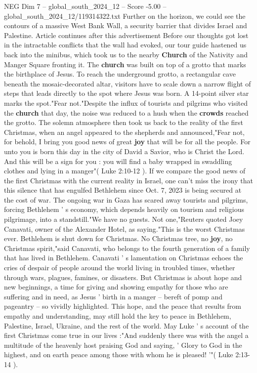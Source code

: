 \begin{textsample}{NEG Dim 7 – global\_south\_2024\_12 – Score -5.00 – global\_south\_2024\_12/119314322.txt}
Further on the horizon, we could see the contours of a massive West Bank Wall, a security barrier that divides Israel and Palestine.
Article continues after this advertisement Before our thoughts got lost in the intractable conflicts that the wall had evoked, our tour guide hastened us back into the minibus, which took us to the nearby \textbf{Church} of the Nativity and Manger Square fronting it.
The \textbf{church} was built on top of a grotto that marks the birthplace of Jesus.
To reach the underground grotto, a rectangular cave beneath the mosaic-decorated altar, visitors have to scale down a narrow flight of steps that leads directly to the spot where Jesus was born.
A 14-point silver star marks the spot."Fear not."Despite the influx of tourists and pilgrims who visited the \textbf{church} that day, the noise was reduced to a hush when the \textbf{crowds} reached the grotto.
The solemn atmosphere then took us back to the reality of the first Christmas, when an angel appeared to the shepherds and announced,"Fear not, for behold, I bring you good news of great \textbf{joy} that will be for all the people.
For unto you is born this day in the city of David a Savior, who is Christ the Lord.
And this will be a sign for you : you will find a baby wrapped in swaddling clothes and lying in a manger"( Luke 2:10-12 ).
If we compare the good news of the first Christmas with the current reality in Israel, one can't miss the irony that this silence that has engulfed Bethlehem since Oct. 7, 2023 is being secured at the cost of war.
The ongoing war in Gaza has scared away tourists and pilgrims, forcing Bethlehem ' s economy, which depends heavily on tourism and religious pilgrimage, into a standstill."We have no guests.
Not one,"Reuters quoted Joey Canavati, owner of the Alexander Hotel, as saying."This is the worst Christmas ever.
Bethlehem is shut down for Christmas.
No Christmas tree, no \textbf{joy}, no Christmas spirit,"said Canavati, who belongs to the fourth generation of a family that has lived in Bethlehem.
Canavati ' s lamentation on Christmas echoes the cries of despair of people around the world living in troubled times, whether through wars, plagues, famines, or disasters.
But Christmas is about hope and new beginnings, a time for giving and showing empathy for those who are suffering and in need, as Jesus ' birth in a manger -- bereft of pomp and pageantry -- so vividly highlighted.
This hope, and the peace that results from empathy and understanding, may still hold the key to peace in Bethlehem, Palestine, Israel, Ukraine, and the rest of the world.
May Luke ' s account of the first Christmas come true in our lives :"And suddenly there was with the angel a multitude of the heavenly host praising God and saying, ' Glory to God in the highest, and on earth peace among those with whom he is pleased! '"( Luke 2:13-14 ).

\end{textsample}
